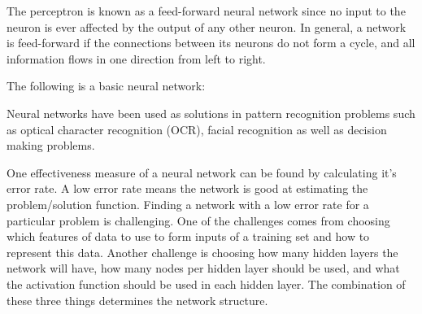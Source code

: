 The perceptron is known as a feed-forward neural network since no input to the neuron is ever affected by the output of any other neuron. In general, a network is feed-forward if the connections between its neurons do not form a cycle, and all information flows in one direction from left to right.


The following is a basic neural network: 




Neural networks have been used as solutions in pattern recognition problems such as optical character recognition (OCR)\cite{ocr1,ocr2}, facial recognition\cite{face} as well as decision making problems\cite{decisionMaking1,decisionMaking2}.






One effectiveness measure of a neural network can be found by calculating it's error rate. A low error rate means the network is good at estimating the problem/solution function. Finding a network with a low error rate for a particular problem is challenging. One of the challenges comes from choosing which features of data to use to form inputs of a training set and how to represent this data. Another challenge is choosing how many hidden layers the network will have, how many nodes per hidden layer should be used, and what the activation function should be used in each hidden layer. The combination of these three things determines the network structure. 



